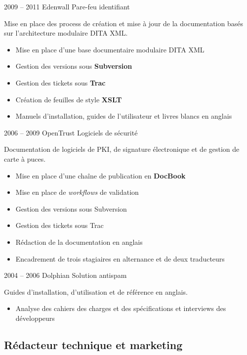 \documentclass[12pt,a4paper,roman]{moderncv}
\begin{document}
\cventry
    {2009 – 2011}
    {Edenwall}
    {Pare-feu identifiant}
    {}
    {}
    {Mise en place des process de création et mise à jour de la documentation
      basés sur l'architecture modulaire DITA XML.
      \begin{itemize}
      \item Mise en place d'une base documentaire modulaire DITA XML
      \item Gestion des versions sous \textbf{Subversion}
      \item Gestion des tickets sous \textbf{Trac}
      \item Création de feuilles de style \textbf{XSLT}
      \item Manuels d'installation, guides de l'utilisateur et livres blancs en
        anglais
    \end{itemize}}


\cventry
    {2006 – 2009}
    {OpenTrust}
    {Logiciels de sécurité}
    {}
    {}
    {Documentation de logiciels de PKI, de signature électronique et
      de gestion de carte à puces.
      \begin{itemize}
      \item Mise en place d'une chaîne de publication en \textbf{DocBook}
      \item Mise en place de \textit{workflows} de validation
      \item Gestion des versions sous Subversion
      \item Gestion des tickets sous Trac
      \item Rédaction de la documentation en anglais
      \item Encadrement de trois stagiaires en alternance et de deux traducteurs
    \end{itemize}}


\cventry
    {2004 – 2006}
    {Dolphian}
    {Solution antispam}
    {}
    {}
    {Guides d'installation, d'utilisation et de référence en anglais.
      \begin{itemize}
      \item Analyse des cahiers des charges et des spécifications et interviews
        des développeurs
    \end{itemize}}


\subsection{Rédacteur technique et marketing}
\end{document}
